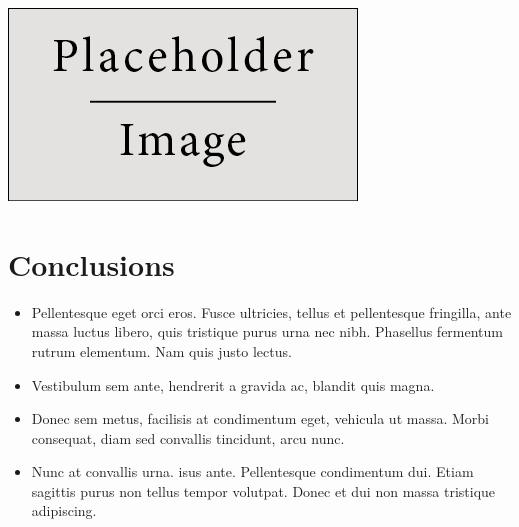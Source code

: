 \documentclass[a0,portrait]{a0poster}
\begin{document}
\begin{multicols}{2}
\begin{center}\vspace{1cm}
\includegraphics[width=0.8\linewidth]{placeholder}
\end{center}\vspace{1cm}


\color{SaddleBrown} %

\section*{Conclusions}

\begin{itemize}
\item Pellentesque eget orci eros. Fusce ultricies, tellus et pellentesque fringilla, ante massa luctus libero, quis tristique purus urna nec nibh. Phasellus fermentum rutrum elementum. Nam quis justo lectus.
\item Vestibulum sem ante, hendrerit a gravida ac, blandit quis magna.
\item Donec sem metus, facilisis at condimentum eget, vehicula ut massa. Morbi consequat, diam sed convallis tincidunt, arcu nunc.
\item Nunc at convallis urna. isus ante. Pellentesque condimentum dui. Etiam sagittis purus non tellus tempor volutpat. Donec et dui non massa tristique adipiscing.
\end{itemize}

\color{DarkSlateGray} %



\end{multicols}
\end{document}
